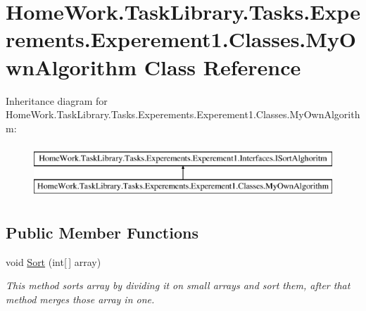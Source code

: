 \hypertarget{class_home_work_1_1_task_library_1_1_tasks_1_1_experements_1_1_experement1_1_1_classes_1_1_my_own_algorithm}{}\section{Home\+Work.\+Task\+Library.\+Tasks.\+Experements.\+Experement1.\+Classes.\+My\+Own\+Algorithm Class Reference}
\label{class_home_work_1_1_task_library_1_1_tasks_1_1_experements_1_1_experement1_1_1_classes_1_1_my_own_algorithm}
Inheritance diagram for Home\+Work.\+Task\+Library.\+Tasks.\+Experements.\+Experement1.\+Classes.\+My\+Own\+Algorithm\+:\begin{figure}[H]
\begin{center}
\leavevmode
\includegraphics[height=2.000000cm]{class_home_work_1_1_task_library_1_1_tasks_1_1_experements_1_1_experement1_1_1_classes_1_1_my_own_algorithm}
\end{center}
\end{figure}
\subsection*{Public Member Functions}
\begin{DoxyCompactItemize}
\item 
void \mbox{\hyperlink{class_home_work_1_1_task_library_1_1_tasks_1_1_experements_1_1_experement1_1_1_classes_1_1_my_own_algorithm_a752eabcabbc1f2f06335e64999213685}{Sort}} (int\mbox{[}$\,$\mbox{]} array)
\begin{DoxyCompactList}\small\item\em This method sorts array by dividing it on small arrays and sort them, after that method merges those array in one. \end{DoxyCompactList}\end{DoxyCompactItemize}
